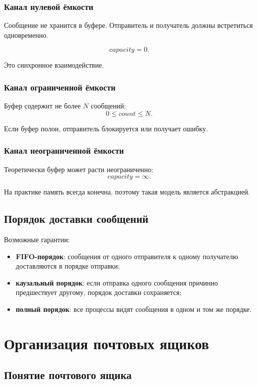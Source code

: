 \documentclass[12pt,a4paper]{article}
\begin{document}
\subsubsection{Канал нулевой ёмкости}

Сообщение не хранится в буфере. Отправитель и получатель должны встретиться одновременно.

\[
capacity = 0.
\]

Это синхронное взаимодействие.

\subsubsection{Канал ограниченной ёмкости}

Буфер содержит не более $N$ сообщений:
\[
0 \leq count \leq N.
\]

Если буфер полон, отправитель блокируется или получает ошибку.

\subsubsection{Канал неограниченной ёмкости}

Теоретически буфер может расти неограниченно:
\[
capacity = \infty.
\]

На практике память всегда конечна, поэтому такая модель является абстракцией.

\subsection{Порядок доставки сообщений}

Возможные гарантии:
\begin{itemize}
    \item \textbf{FIFO-порядок}: сообщения от одного отправителя к одному получателю доставляются в порядке отправки;
    \item \textbf{каузальный порядок}: если отправка одного сообщения причинно предшествует другому, порядок доставки сохраняется;
    \item \textbf{полный порядок}: все процессы видят сообщения в одном и том же порядке.
\end{itemize}

\section{Организация почтовых ящиков}

\subsection{Понятие почтового ящика}
\end{document}
